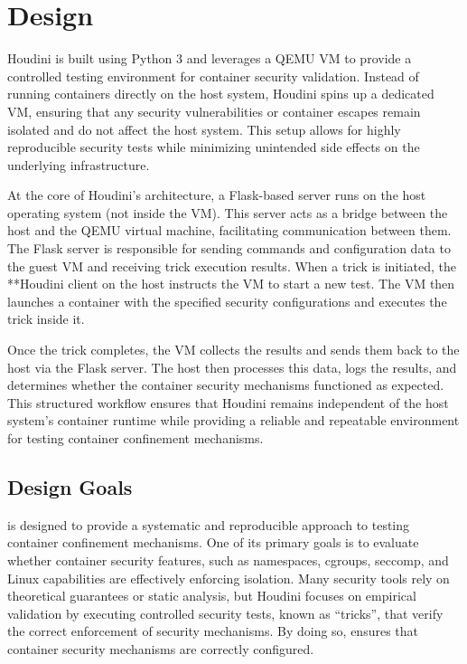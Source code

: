\section{Design}

Houdini is built using Python 3 and leverages a QEMU VM to provide a controlled testing environment for container security validation. Instead of running containers directly on the host system, Houdini spins up a dedicated VM, ensuring that any security vulnerabilities or container escapes remain isolated and do not affect the host system. This setup allows for highly reproducible security tests while minimizing unintended side effects on the underlying infrastructure.  

At the core of Houdini’s architecture, a Flask-based server runs on the host operating system (not inside the VM). This server acts as a bridge between the host and the QEMU virtual machine, facilitating communication between them. The Flask server is responsible for sending commands and configuration data to the guest VM and receiving trick execution results. When a trick is initiated, the **Houdini client on the host instructs the VM to start a new test. The VM then launches a container with the specified security configurations and executes the trick inside it.  

Once the trick completes, the VM collects the results and sends them back to the host via the Flask server. The host then processes this data, logs the results, and determines whether the container security mechanisms functioned as expected. This structured workflow ensures that Houdini remains independent of the host system’s container runtime while providing a reliable and repeatable environment for testing container confinement mechanisms.

\label{sec:design}

\subsection{Design Goals}

\houdini is designed to provide a systematic and reproducible approach to testing container confinement mechanisms. One of its primary goals is to evaluate whether container security features, such as namespaces, cgroups, seccomp, and Linux capabilities are effectively enforcing isolation. Many security tools rely on theoretical guarantees or static analysis, but Houdini focuses on empirical validation by executing controlled security tests, known as \enquote{tricks}, that verify the correct enforcement of security mechanisms. By doing so, \houdini ensures that container security mechanisms are correctly configured.

